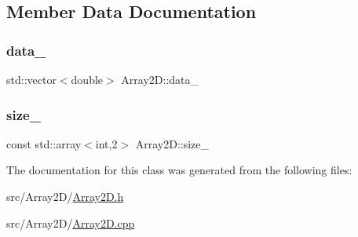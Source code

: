 \subsection{Member Data Documentation}
\mbox{\label{classArray2D_af1572f75d219caab4b2372a98341b991}} 
\subsubsection{\texorpdfstring{data\_}{data\_}}
{\footnotesize\ttfamily std\+::vector$<$double$>$ Array2\+D\+::data\+\_\+\hspace{0.3cm}{\ttfamily [protected]}}

\mbox{\label{classArray2D_a6494778c15c3feb46e6299aa2e0bd3c6}} 
\subsubsection{\texorpdfstring{size\_}{size\_}}
{\footnotesize\ttfamily const std\+::array$<$int,2$>$ Array2\+D\+::size\+\_\+\hspace{0.3cm}{\ttfamily [protected]}}



The documentation for this class was generated from the following files\+:\begin{DoxyCompactItemize}
\item 
src/\+Array2\+D/\mbox{\hyperlink{Array2D_8h}{Array2\+D.\+h}}\item 
src/\+Array2\+D/\mbox{\hyperlink{Array2D_8cpp}{Array2\+D.\+cpp}}\end{DoxyCompactItemize}
